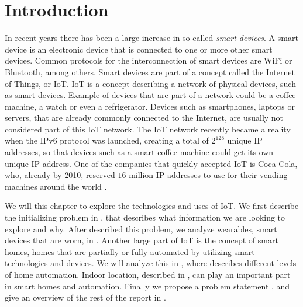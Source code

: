 \chapter{Introduction}\label{chap:introduction}
In recent years there has been a large increase in so-called \emph{smart devices}. 
A smart device is an electronic device that is connected to one or more other smart devices. 
Common protocols for the interconnection of smart devices are WiFi or Bluetooth, among others.
Smart devices are part of a concept called the Internet of Things, or IoT. 
IoT is a concept describing a network of physical devices, such as smart devices. 
Example of devices that are part of a network could be a coffee machine, a watch or even a refrigerator. 
Devices such as smartphones, laptops or servers, that are already commonly connected to the Internet, are usually not considered part of this IoT network. 
The IoT network recently became a reality when the IPv6 protocol was launched,
creating a total of $2^{128}$ unique IP addresses, 
so that devices such as a smart coffee machine could get its own unique IP address. 
One of the companies that quickly accepted IoT is Coca-Cola, 
who, already by 2010, reserved $16$ million IP addresses to use for \eg their vending machines around the world \cite{coke-iot}. 

We will this chapter to explore the technologies and uses of IoT. 
We first describe the initializing problem in , 
that describes what information we are looking to explore and why. 
After described this problem, we analyze wearables, \ie smart devices that are worn, in .
Another large part of IoT is the concept of smart homes, 
\ie homes that are partially or fully automated by utilizing smart technologies and devices. 
We will analyze this in , 
where  describes different levels of home automation. 
Indoor location, described in , 
can play an important part in smart homes and automation.
Finally we propose a problem statement , 
and give an overview of the rest of the report in .








